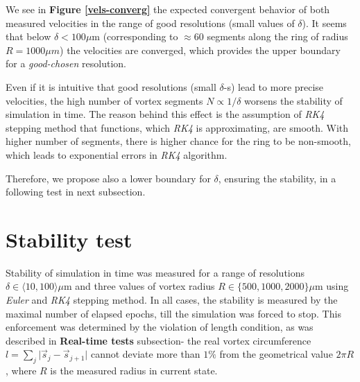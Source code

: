 We see in \textbf{Figure \ref{vels-converg}} the expected convergent behavior of both measured velocities in the range of good resolutions (small values of $\delta$). It seems that below $ \delta < 100 \mu\text{m}$  (corresponding to $\approx 60$ segments along the ring of radius $R=1000 \mu \unit{m}$) the velocities are converged, which provides the upper boundary for a \textit{good-chosen} resolution.

Even if it is intuitive that good resolutions (small $\delta$-s) lead to more precise velocities, the high number of vortex segments $N \propto 1/\delta$ worsens the stability of simulation in time. The reason behind this effect is the assumption of \textit{RK4} stepping method that functions, which \textit{RK4} is approximating, are smooth. With higher number of segments, there is higher chance for the ring to be non-smooth, which leads to exponential errors in \textit{RK4} algorithm.

Therefore, we propose also a lower boundary for  $\delta$, ensuring the stability, in a following test in next subsection.


\section{Stability test}

Stability of simulation in time was measured for a range of resolutions $\delta \in \langle 10, 100 \rangle \mu\text{m}$ and three values of vortex radius $R \in \{500, 1000, 2000\} \mu\text{m}$ using \textit{Euler} and \textit{RK4} stepping method. In all cases, the stability is measured by the maximal number of elapsed epochs, till the simulation was forced to stop.
This enforcement was determined by the violation of length condition, as was described in \textbf{Real-time tests} subsection- the real vortex circumference $l = \sum_j \vert \vec{s}_j - \vec{s}_{j+1} \vert$ cannot deviate more than $1\%$ from the geometrical value $2\pi R$, where $R$ is the measured radius in current state.

